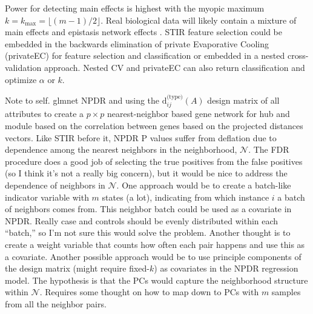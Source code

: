 \documentclass[10pt]{article}
\begin{document}
Power for detecting main effects is highest with the myopic maximum $k=k_{\text{max}}=\lfloor (m-1)/2\rfloor$. Real biological data will likely contain a mixture of main effects and epistasis network effects \cite{mckinney_pajewski}. STIR feature selection could be embedded in the backwards elimination of private Evaporative Cooling (privateEC) for feature selection and classification \cite{le17} or embedded in a nested cross-validation approach. Nested CV and privateEC can also return classification and optimize $\alpha$ or $k$. 


Note to self. glmnet NPDR and using the $\text{d}^{\text{(type)}}_{ij}(A)$ design matrix of all attributes to create a $p \times p$ nearest-neighbor based gene network for hub and module based on the correlation between genes based on the projected distances vectors. Like STIR before it, NPDR P values suffer from deflation due to dependence among the nearest neighbors in the neighborhood, $\mathcal{N}$. The FDR procedure does a good job of selecting the true positives from the false positives (so I think it's not a really big concern), but it would be nice to address the dependence of neighbors in $\mathcal{N}$. One approach would be to create a batch-like indicator variable with $m$ states (a lot), indicating from which instance $i$ a batch of neighbors comes from. This neighbor batch could be used as a covariate in NPDR. Really case and controls should be evenly distributed within each ``batch,'' so I'm not sure this would solve the problem. Another thought is to create a weight variable that counts how often each pair happens and use this as a covariate. Another possible approach would be to use principle components of the design matrix (might require fixed-$k$) as covariates in the NPDR regression model. The hypothesis is that the PCs would capture the neighborhood structure within $\mathcal{N}$. Requires some thought on how to map down to PCs with $m$ samples from all the neighbor pairs.
\end{document}

